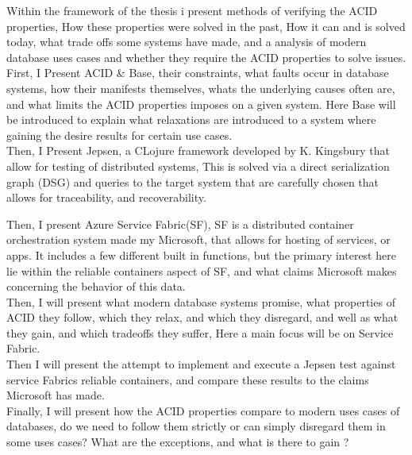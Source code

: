\documentclass[a4paper,10pt,titlepage]{report}
\begin{document}
Within the framework of the thesis i present methods of verifying the ACID properties, How these properties were solved in the past, How it can and is solved today, what trade offs some systems have made, and a analysis of modern database uses cases and whether they require the ACID properties to solve issues.\\
\vspace{5mm}
First, I Present ACID \& Base, their constraints, what faults occur in database systems, how their manifests themselves, whats the underlying causes often are, and what limits the ACID properties imposes on a given system. Here Base will be introduced to explain what relaxations are introduced to a system where gaining the desire results for certain use cases. \\
\vspace{5mm}
Then, I Present Jepsen, a CLojure framework\cite{jepsonio} developed by K. Kingsbury that allow for testing of distributed systems, This is solved via a direct serialization graph (DSG) and queries to the target system that are carefully chosen that allows for traceability, and recoverability.  \\
\vspace{5mm}

Then, I present Azure Service Fabric(SF), SF is a distributed container orchestration system made my Microsoft, that allows for hosting of services, or apps. It includes a few different built in functions, but the primary interest here lie within the reliable containers aspect of SF, and what claims Microsoft makes concerning the behavior of this data.\\
\vspace{5mm}
Then, I will present what modern database systems promise, what properties of ACID they follow, which they relax, and which they disregard, and well as what they gain, and which tradeoffs they suffer, Here a main focus will be on Service Fabric.\\
\vspace{5mm}
Then I will present the attempt to implement and execute a Jepsen test against service Fabrics reliable containers, and compare these results to the claims Microsoft has made.\\
\vspace{5mm}
Finally, I will present how the ACID properties compare to modern uses cases of databases, do we need to follow them strictly or can simply disregard them in some uses cases? What are the exceptions, and what is there to gain ?\\
\end{document}
